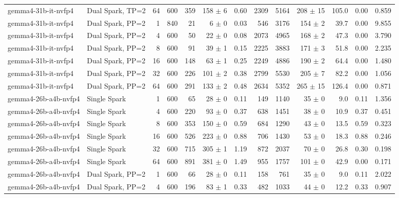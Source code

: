 \begin{tabular}{l l r r r r r r r r r r r}
gemma4-31b-it-nvfp4 & Dual Spark, TP=2 & 64 & 600 & 359 & 158 $\pm$ 6 & 0.60 & 2309 & 5164 & 208 $\pm$ 15 & 105.0 & 0.00 & 0.859 \\
\addlinespace
gemma4-31b-it-nvfp4 & Dual Spark, PP=2 & 1 & 840 & 21\rlap{$^\dagger$} & 6 $\pm$ 0 & 0.03 & 546 & 3176 & 154 $\pm$ 2 & 39.7 & 0.00 & 9.855 \\
gemma4-31b-it-nvfp4 & Dual Spark, PP=2 & 4 & 600 & 50\rlap{$^\dagger$} & 22 $\pm$ 0 & 0.08 & 2073 & 4965 & 168 $\pm$ 2 & 47.3 & 0.00 & 3.790 \\
gemma4-31b-it-nvfp4 & Dual Spark, PP=2 & 8 & 600 & 91\rlap{$^\dagger$} & 39 $\pm$ 1 & 0.15 & 2225 & 3883 & 171 $\pm$ 3 & 51.8 & 0.00 & 2.235 \\
gemma4-31b-it-nvfp4 & Dual Spark, PP=2 & 16 & 600 & 148 & 63 $\pm$ 1 & 0.25 & 2249 & 4886 & 190 $\pm$ 2 & 64.4 & 0.00 & 1.480 \\
gemma4-31b-it-nvfp4 & Dual Spark, PP=2 & 32 & 600 & 226 & 101 $\pm$ 2 & 0.38 & 2799 & 5530 & 205 $\pm$ 7 & 82.2 & 0.00 & 1.056 \\
gemma4-31b-it-nvfp4 & Dual Spark, PP=2 & 64 & 600 & 291 & 133 $\pm$ 2 & 0.48 & 2634 & 5352 & 265 $\pm$ 15 & 126.4 & 0.00 & 0.871 \\
\addlinespace
gemma4-26b-a4b-nvfp4 & Single Spark & 1 & 600 & 65\rlap{$^\dagger$} & 28 $\pm$ 0 & 0.11 & 149 & 1140 & 35 $\pm$ 0 & 9.0 & 0.11 & 1.356 \\
gemma4-26b-a4b-nvfp4 & Single Spark & 4 & 600 & 220 & 93 $\pm$ 0 & 0.37 & 638 & 1451 & 38 $\pm$ 0 & 10.9 & 0.37 & 0.451 \\
gemma4-26b-a4b-nvfp4 & Single Spark & 8 & 600 & 353 & 150 $\pm$ 0 & 0.59 & 684 & 1290 & 43 $\pm$ 0 & 13.5 & 0.59 & 0.323 \\
gemma4-26b-a4b-nvfp4 & Single Spark & 16 & 600 & 526 & 223 $\pm$ 0 & 0.88 & 706 & 1430 & 53 $\pm$ 0 & 18.3 & 0.88 & 0.246 \\
gemma4-26b-a4b-nvfp4 & Single Spark & 32 & 600 & 715 & 305 $\pm$ 1 & 1.19 & 872 & 2037 & 70 $\pm$ 0 & 26.8 & 0.30 & 0.198 \\
gemma4-26b-a4b-nvfp4 & Single Spark & 64 & 600 & 891 & 381 $\pm$ 0 & 1.49 & 955 & 1757 & 101 $\pm$ 0 & 42.9 & 0.00 & 0.171 \\
\addlinespace
gemma4-26b-a4b-nvfp4 & Dual Spark, PP=2 & 1 & 600 & 66\rlap{$^\dagger$} & 28 $\pm$ 0 & 0.11 & 158 & 761 & 35 $\pm$ 0 & 9.0 & 0.11 & 2.022 \\
gemma4-26b-a4b-nvfp4 & Dual Spark, PP=2 & 4 & 600 & 196 & 83 $\pm$ 1 & 0.33 & 482 & 1033 & 44 $\pm$ 0 & 12.2 & 0.33 & 0.907 \\

\end{tabular}
